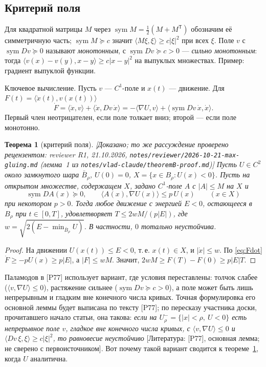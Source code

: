 \documentclass[11pt,a4paper]{article}
\newtheorem{theorem}{Теорема}[section]
\theoremstyle{definition}
\newcommand{\sym}{\operatorname{sym}}
\newcommand{\mk}[1]{\textsf{[#1]}}
\newcommand{\term}[1]{\emph{#1}}
\begin{document}
\subsection{Критерий поля}

Для квадратной матрицы $M$ через $\sym M=\tfrac12(M+M^{\mathsf T})$ обозначим её симметричную
часть; $\sym M\succeq c$ значит $\langle M\xi,\xi\rangle\ge c|\xi|^2$ при всех $\xi$. Поле $v$ с
$\sym Dv\succeq0$ называют \term{монотонным}, с $\sym Dv\succeq c>0$ --- \term{сильно
монотонным}: тогда $\langle v(x)-v(y),x-y\rangle\ge c|x-y|^2$ на выпуклых множествах.
Пример: градиент выпуклой функции.

Ключевое вычисление. Пусть $v$ --- $C^1$-поле и $x(t)$ --- движение. Для
$F(t)=\langle\dot x(t),v(x(t))\rangle$
\begin{equation}\label{eq:Fdot}
\dot F=\langle\ddot x,v\rangle+\langle\dot x,Dv\,\dot x\rangle
=-\langle\nabla U,v\rangle+\langle\sym Dv\,\dot x,\dot x\rangle .
\end{equation}
Первый член неотрицателен, если поле толкает вниз; второй --- если поле монотонно.

\begin{theorem}[критерий поля]\label{thm:field}
\mk{Доказано; то же рассуждение проверено рецензентом: reviewer R1, 21.10.2026,
\texttt{notes/reviewer/2026-10-21-max-gluing.md} (лемма~1 из
\texttt{notes/vlad-claude/theoremB-proof.md})} Пусть $U\in C^2$ около замкнутого шара
$\bar B_\rho$, $U(0)=0$, $X=\{x\in B_\rho:U(x)<0\}$. Пусть на открытом множестве, содержащем
$X$, задано $C^1$-поле $A$ с $|A|\le M$ на $X$ и
\[
\sym DA(x)\succeq0,\qquad \langle A(x),\nabla U(x)\rangle\le p\,U(x)\qquad(x\in X)
\]
при некотором $p>0$. Тогда любое движение с энергией $E<0$, остающееся в $B_\rho$ при
$t\in[0,T]$, удовлетворяет $T\le 2wM/(p|E|)$, где $w=\sqrt{2(E-\min_{\bar B_\rho}U)}$. В
частности, $0$ тотально неустойчива.
\end{theorem}
\begin{proof}
На движении $U(x(t))\le E<0$, т.\,е. $x(t)\in X$, и $|\dot x|\le w$. По \eqref{eq:Fdot}
$\dot F\ge-pU(x)\ge p|E|$, а $|F|\le wM$. Значит, $2wM\ge F(T)-F(0)\ge p|E|T$.
\end{proof}

Паламодов в [P77] использует вариант, где условия переставлены: толчок слабее
($\langle v,\nabla U\rangle\le0$), растяжение сильнее ($\sym Dv\succeq c>0$), а поле может быть
лишь непрерывным и гладким вне конечного числа кривых. Точная формулировка его основной леммы
будет выписана по тексту [P77]; по пересказу участника доски, прочитавшего начало статьи, она
такова: \emph{если на $U^-_\rho=\{|x|<\rho,\ U<0\}$ есть непрерывное поле $v$, гладкое вне
конечного числа кривых, с $\langle v,\nabla U\rangle\le0$ и $\langle Dv\,\xi,\xi\rangle\ge c|\xi|^2$,
то равновесие неустойчиво} \mk{Литература: [P77], основная лемма; не сверено с первоисточником}.
Вот почему такой вариант сводится к теореме~\ref{thm:field}, когда $U$ аналитична.
\end{document}
